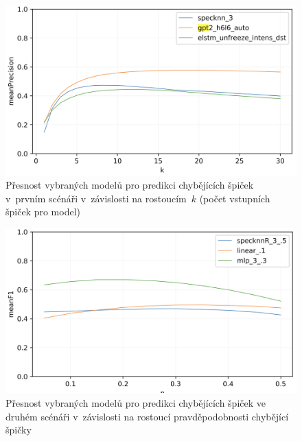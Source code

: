 \documentclass[a4paper,11pt]{article}
\begin{document}
\begin{figure}
\begin{center}
\includegraphics[width=.667\hsize]{result-missing}
\end{center}
\caption{Přesnost vybraných modelů pro predikci chybějících špiček v~prvním scénáři v~závislosti na rostoucím~$k$
(počet vstupních špiček pro model)
}
\label{f:result-missing}
\end{figure}

\begin{figure}
\begin{center}
\includegraphics[width=.667\hsize]{result-wrong}
\end{center}
\caption{Přesnost vybraných modelů pro predikci chybějících špiček ve druhém scénáři v~závislosti na rostoucí
pravděpodobnosti chybějící špičky}
\label{f:result-wrong}
\end{figure}
\end{document}
